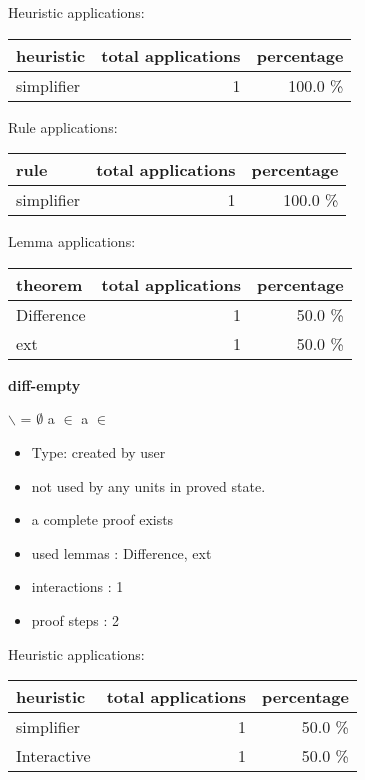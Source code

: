\documentclass[a4paper]{article}
\begin{document}
\medskip


Heuristic applications:

\begin{supertabular}{l|r|r}
heuristic	& total applications & percentage \\ \hline
simplifier & 1 & 100.0 \% \\

\end{supertabular}

Rule applications:

\begin{supertabular}{l|r|r}
rule	        & total applications & percentage \\ \hline
simplifier & 1 & 100.0 \% \\

\end{supertabular}

Lemma applications:

\begin{supertabular}{l|r|r}
theorem	        & total applications & percentage \\ \hline
Difference & 1 & 50.0 \% \\
ext & 1 & 50.0 \% \\

\end{supertabular}
\pagebreak

{\LARGE\bf diff-empty}\label{lemma-diff-empty}

\medskip

 \Fol {} $\backslash$  = $\emptyset$ \And a $\in$  \Imp a $\in$ 

\begin{itemize}

\item Type: created by user

\item not used by any units in proved state.
\item       a complete proof exists
\item       used lemmas  : Difference, ext
\item       interactions : 1
\item       proof steps  : 2
\end{itemize}

\medskip


Heuristic applications:

\begin{supertabular}{l|r|r}
heuristic	& total applications & percentage \\ \hline
simplifier & 1 & 50.0 \% \\
Interactive & 1 & 50.0 \% \\

\end{supertabular}
\end{document}
